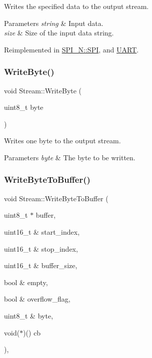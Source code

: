 Writes the specified data to the output stream. 
\begin{DoxyParams}{Parameters}
{\em string} & Input data. \\
\hline
{\em size} & Size of the input data string. \\
\hline
\end{DoxyParams}


Reimplemented in \hyperlink{class_s_p_i___n_1_1_s_p_i_a3e2e2a7f02ffa5003548a1b9d820ce9a}{S\+P\+I\+\_\+\+N\+::\+S\+PI}, and \hyperlink{class_u_a_r_t_a8bb77ca27b4e17d608d2743313625ac4}{U\+A\+RT}.

\hypertarget{class_stream_aeaed767b3a8d946c6f81465fa83ff17f}{}\label{class_stream_aeaed767b3a8d946c6f81465fa83ff17f} 
\subsubsection{\texorpdfstring{Write\+Byte()}{WriteByte()}}
{\footnotesize\ttfamily void Stream\+::\+Write\+Byte (\begin{DoxyParamCaption}\item[{uint8\+\_\+t}]{byte }\end{DoxyParamCaption})\hspace{0.3cm}{\ttfamily [virtual]}}

Writes one byte to the output stream. 
\begin{DoxyParams}{Parameters}
{\em byte} & The byte to be written. \\
\hline
\end{DoxyParams}
\hypertarget{class_stream_a0da4122369b2e625c8e4a224cc598a04}{}\label{class_stream_a0da4122369b2e625c8e4a224cc598a04} 
\subsubsection{\texorpdfstring{Write\+Byte\+To\+Buffer()}{WriteByteToBuffer()}}
{\footnotesize\ttfamily void Stream\+::\+Write\+Byte\+To\+Buffer (\begin{DoxyParamCaption}\item[{uint8\+\_\+t $\ast$}]{buffer,  }\item[{uint16\+\_\+t \&}]{start\+\_\+index,  }\item[{uint16\+\_\+t \&}]{stop\+\_\+index,  }\item[{uint16\+\_\+t \&}]{buffer\+\_\+size,  }\item[{bool \&}]{empty,  }\item[{bool \&}]{overflow\+\_\+flag,  }\item[{uint8\+\_\+t \&}]{byte,  }\item[{void($\ast$)()}]{cb }\end{DoxyParamCaption})\hspace{0.3cm}{\ttfamily [protected]}, {\ttfamily [virtual]}}

